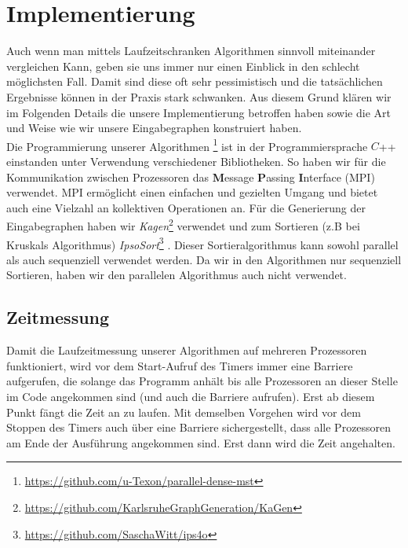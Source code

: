 \section{Implementierung}\label{Implementierung}
Auch wenn man mittels Laufzeitschranken Algorithmen sinnvoll miteinander vergleichen Kann, geben sie uns immer nur einen Einblick in den schlecht möglichsten Fall. Damit sind diese oft sehr pessimistisch und die tatsächlichen Ergebnisse können in der Praxis stark schwanken. Aus diesem Grund klären wir im Folgenden Details die unsere Implementierung betroffen haben sowie die Art und Weise wie wir unsere Eingabegraphen konstruiert haben.\\
Die Programmierung unserer Algorithmen \footnote{\url{https://github.com/u-Texon/parallel-dense-mst}} ist in der Programmiersprache $C$++ einstanden unter Verwendung verschiedener Bibliotheken. So haben wir für die Kommunikation zwischen Prozessoren das \textbf{M}essage \textbf{P}assing \textbf{I}nterface (MPI) verwendet. MPI ermöglicht einen einfachen und gezielten Umgang und bietet auch eine Vielzahl an kollektiven Operationen an.
Für die Generierung der Eingabegraphen haben wir \textit{Kagen}\footnote{\url{https://github.com/KarlsruheGraphGeneration/KaGen}} \cite{funke2017communication,HubSan2020RMAT} verwendet und zum Sortieren (z.B bei Kruskals Algorithmus) 
\textit{IpsoSort}\footnote{\url{https://github.com/SaschaWitt/ips4o}} \cite{axtmann2017}. Dieser Sortieralgorithmus kann sowohl parallel als auch sequenziell verwendet werden. Da wir in den Algorithmen nur sequenziell Sortieren, haben wir den parallelen Algorithmus auch nicht verwendet.


\subsection{Zeitmessung}
Damit die Laufzeitmessung unserer Algorithmen auf mehreren Prozessoren funktioniert, wird vor dem Start-Aufruf des Timers immer eine Barriere aufgerufen, die solange das Programm anhält bis alle Prozessoren an dieser Stelle im Code angekommen sind (und auch die Barriere aufrufen). Erst ab diesem Punkt fängt die Zeit an zu laufen. Mit demselben Vorgehen wird vor dem Stoppen des Timers auch über eine Barriere sichergestellt, dass alle Prozessoren am Ende der Ausführung angekommen sind. Erst dann wird die Zeit angehalten. \\

